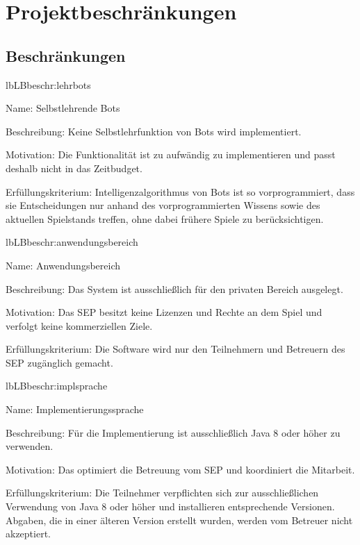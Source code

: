 \chapter{Projektbeschränkungen}

\section{Beschränkungen}

\setcounter{lb}{10}

\begin{description}[leftmargin=5em, style=sameline]
	
	\begin{lhp}{lb}{LB}{beschr:lehrbots}
		\item [Name:] Selbstlehrende Bots
		\item [Beschreibung:] Keine Selbstlehrfunktion von Bots wird implementiert.
		\item [Motivation:] Die Funktionalität ist zu aufwändig zu implementieren und passt deshalb nicht in das Zeitbudget.
		\item [Erfüllungskriterium:] Intelligenzalgorithmus von Bots ist so vorprogrammiert, dass sie Entscheidungen nur anhand des vorprogrammierten Wissens sowie des aktuellen Spielstands treffen, ohne dabei frühere Spiele zu berücksichtigen.
	\end{lhp}
	
	\begin{lhp}{lb}{LB}{beschr:anwendungsbereich}
		\item [Name:] Anwendungsbereich
		\item [Beschreibung:] Das System ist ausschließlich für den privaten Bereich ausgelegt.
		\item [Motivation:] Das SEP besitzt keine Lizenzen und Rechte an dem Spiel und verfolgt keine kommerziellen Ziele.
		\item [Erfüllungskriterium:] Die Software wird nur den Teilnehmern und Betreuern des SEP zugänglich gemacht.
	\end{lhp}
	
		
	\begin{lhp}{lb}{LB}{beschr:implsprache}
		\item [Name:] Implementierungssprache
		\item [Beschreibung:] Für die Implementierung ist ausschließlich Java 8 oder höher zu verwenden.
		\item [Motivation:] Das optimiert die Betreuung vom SEP und koordiniert die Mitarbeit.
		\item [Erfüllungskriterium:] Die Teilnehmer verpflichten sich zur ausschließlichen Verwendung von Java 8 oder höher und installieren entsprechende Versionen. Abgaben, die in einer älteren Version erstellt wurden, werden vom Betreuer nicht akzeptiert.
	\end{lhp}
	

\end{description}
